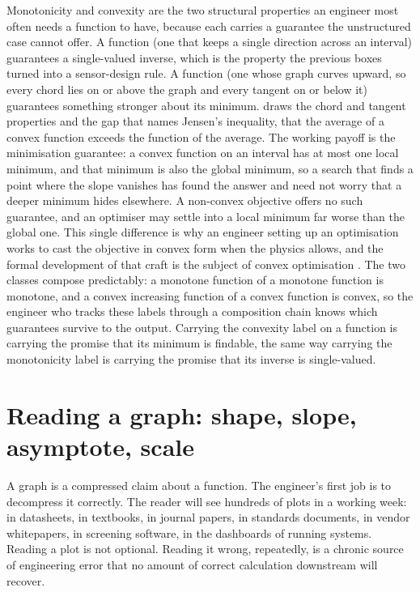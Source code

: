 \begin{mastery}
Monotonicity and convexity are the two structural properties an
engineer most often needs a function to have, because each carries a
guarantee the unstructured case cannot offer. A 
function (one that keeps a single direction across an interval)
guarantees a single-valued inverse, which is the property the previous
boxes turned into a sensor-design rule. A  function
(one whose graph curves upward, so every chord lies on or above the
graph and every tangent on or below it) guarantees something stronger
about its minimum.
 draws the chord and tangent
properties and the gap that names Jensen's inequality, that the
average of a convex function exceeds the function of the average. The
working payoff is the minimisation guarantee: a convex function on an
interval has at most one local minimum, and that minimum is also the
global minimum, so a search that finds a point where the slope
vanishes has found the answer and need not worry that a deeper
minimum hides elsewhere. A non-convex objective offers no such
guarantee, and an optimiser may settle into a local minimum far worse
than the global one. This single difference is why an engineer setting
up an optimisation works to cast the objective in convex form when the
physics allows, and the formal development of that craft is the
subject of convex optimisation
\cite{text:boyd-vandenberghe2004}. The two classes compose
predictably: a monotone function of a monotone function is monotone,
and a convex increasing function of a convex function is convex, so
the engineer who tracks these labels through a composition chain knows
which guarantees survive to the output. Carrying the convexity label on
a function is carrying the promise that its minimum is findable, the
same way carrying the monotonicity label is carrying the promise that
its inverse is single-valued.
\end{mastery}



\section{Reading a graph: shape, slope, asymptote, scale}

A graph is a compressed claim about a function. The engineer's
first job is to decompress it correctly. The reader will see hundreds
of plots in a working week: in datasheets, in textbooks, in journal
papers, in standards documents, in vendor whitepapers, in screening
software, in the dashboards of running systems. Reading a plot is
not optional. Reading it wrong, repeatedly, is a chronic source of
engineering error that no amount of correct calculation downstream
will recover.

